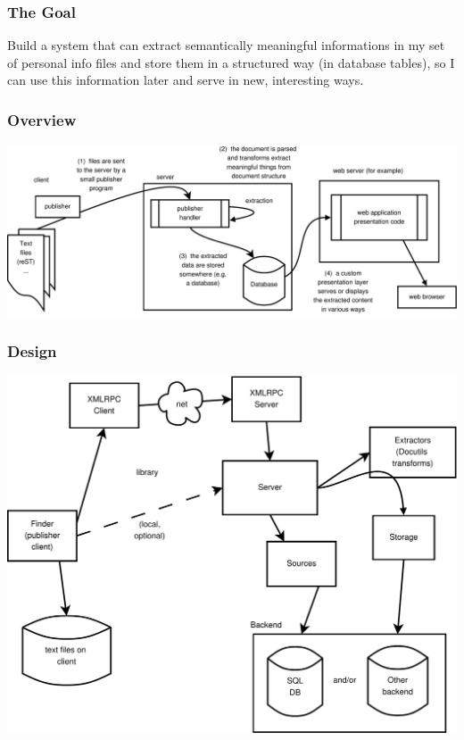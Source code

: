 \documentclass[compress,trans]{beamer}
\begin{document}
\begin{frame}[fragile]
  \frametitle{The Goal}

  Build a system that can extract semantically meaningful informations in my set
  of personal info files and store them in a structured way (in database
  tables), so I can use this information later and serve in new, interesting
  ways.

\end{frame}



\begin{frame}[fragile]
  \frametitle{Overview}

\includegraphics[width=1.0\textwidth]{../nabu2.pdf}

\end{frame}



\begin{frame}[fragile]
  \frametitle{Design}

\includegraphics[width=1.0\textwidth]{../nabu1.pdf}

\end{frame}
\end{document}
